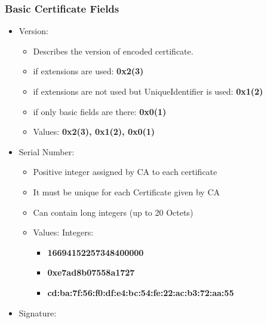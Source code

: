 \documentclass[a4paper]{article}
\begin{document}
    \subsubsection{Basic Certificate Fields}
        \begin{itemize}
            \item Version:
                \begin{itemize}
                    \item Describes the version of encoded certificate.
                    \item if extensions are used: \textbf{0x2(3)}
                    \item if extensions are not used but UniqueIdentifier is used: \textbf{0x1(2)}
                    \item if only basic fields are there: \textbf{0x0(1)}
                \end{itemize}
                \begin{itemize}
                    \item Values: \textbf{0x2(3), 0x1(2), 0x0(1)}
                \end{itemize}
            \item Serial Number:
                \begin{itemize}
                    \item Positive integer assigned by CA to each certificate
                    \item It must be unique for each Certificate given by CA
                    \item Can contain long integers (up to 20 Octets)
                \end{itemize}
                \begin{itemize}
                    \item Values: Integers: 
                    \begin{itemize}
                        \item \textbf{16694152257348400000}
                        \item \textbf{0xe7ad8b07558a1727}
                        \item \textbf{cd:ba:7f:56:f0:df:e4:bc:54:fe:22:ac:b3:72:aa:55}
                    \end{itemize}
                \end{itemize}
            \item Signature:
                \begin{itemize}

\end{itemize}
\end{itemize}
\end{document}
